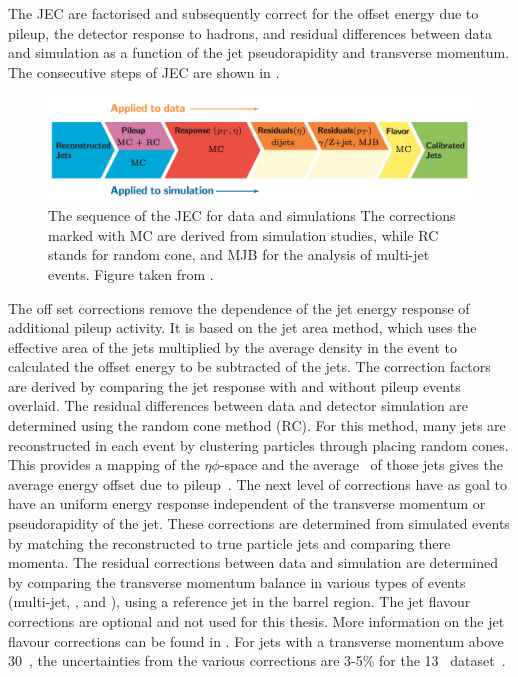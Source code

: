 The JEC are factorised and subsequently correct for the offset energy due to pileup, the detector response to hadrons, and residual differences between data and simulation as a function of the jet pseudorapidity and transverse momentum.  The consecutive steps of JEC are shown in . 
\begin{figure}[htbp]
	\centering
	\includegraphics[width=1.\linewidth]{4_EventRecoSelect/Figures/JES}
	\caption{The sequence of the JEC for data and simulations The corrections marked with MC are derived from simulation studies, while RC stands for random cone, and MJB for the analysis of multi-jet events. Figure taken from \cite{1748-0221-12-02-P02014}.}
	\label{fig:jes}
\end{figure}
The off set corrections remove the dependence of the jet energy response of additional pileup activity. It is based on the jet area method, which uses the effective area of the jets multiplied by the average density in the event to calculated the offset energy to be subtracted of the jets.  The correction factors are derived by comparing the jet response with and without pileup events overlaid. The residual differences between data and detector simulation are determined using the random cone method (RC). For this method, many jets are reconstructed in each event by clustering particles through placing  random cones. This provides a mapping of the $\eta\phi$-space and the average \pt\ of those jets gives the average energy offset due to pileup~\cite{1748-0221-12-02-P02014}. 
The next level of corrections have as goal to have an uniform energy response independent of the transverse momentum or pseudorapidity of the jet.  These corrections are determined from simulated events by matching the reconstructed to true particle jets and comparing there momenta. 
The residual corrections between data and simulation are determined by comparing the transverse momentum balance in various types of events (multi-jet, \Zjets, and \pjets), using a reference jet in the barrel region.  
The jet flavour corrections are optional and not used for this thesis. More information on the jet flavour corrections can be found in \cite{1748-0221-12-02-P02014}. For jets with a transverse momentum above 30~\GeV, the uncertainties from the various corrections are 3-5\% for the 13 \TeV\ dataset~\cite{CMS-DP-2016-020}.


